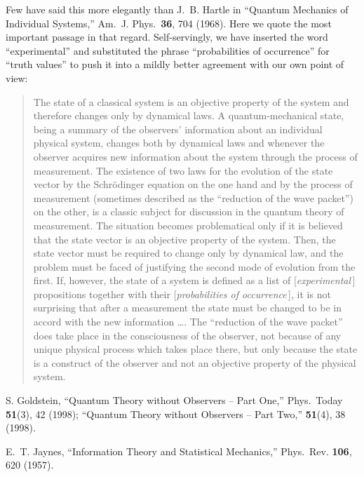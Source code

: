\begin{thebibliography}{10}
Few have said this more elegantly than J.~B. Hartle in ``Quantum
Mechanics of Individual Systems,'' Am.\ J. Phys.\ {\bf 36}, 704
(1968).  Here we quote the most important passage in that regard.
Self-servingly, we have inserted the word ``experimental'' and
substituted the phrase ``probabilities of occurrence'' for ``truth
values'' to push it into a mildly better agreement with our own
point of view:
\begin{quotation}
\footnotesize\indent The state of a classical system is an objective
property of the system and therefore changes only by dynamical laws.
A quantum-mechanical state, being a summary of the observers'
information about an individual physical system, changes both by
dynamical laws and whenever the observer acquires new information
about the system through the process of measurement.  The existence
of two laws for the evolution of the state vector by the
Schr\"odinger equation on the one hand and by the process of
measurement (sometimes described as the ``reduction of the wave
packet'') on the other, is a classic subject for discussion in the
quantum theory of measurement. The situation becomes problematical
only if it is believed that the state vector is an objective
property of the system. Then, the state vector must be required to
change only by dynamical law, and the problem must be faced of
justifying the second mode of evolution from the first. If, however,
the state of a system is defined as a list of [{\it experimental\,}]
propositions together with their [{\it probabilities of
occurrence\,}], it is not surprising that after a measurement the
state must be changed to be in accord with the new information
\ldots\@.
The ``reduction of the wave
packet'' does take place in the consciousness of the observer, not
because of any unique physical process which takes place there, but
only because the state is a construct of the observer and not an
objective property of the physical system.
\end{quotation}

S. Goldstein, ``Quantum Theory without Observers -- Part One,''
Phys.\ Today {\bf 51}(3), 42 (1998); ``Quantum Theory without
Observers -- Part Two,'' {\bf 51}(4), 38 (1998).

E.~T. Jaynes, ``Information Theory and Statistical Mechanics,''
Phys.\ Rev. {\bf 106}, 620 (1957).


\end{thebibliography}
